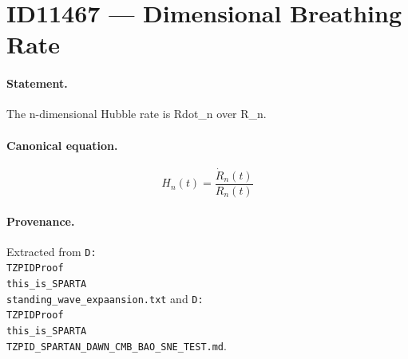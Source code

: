 \section*{ID11467 --- Dimensional Breathing Rate}

\paragraph{Statement.}
The n-dimensional Hubble rate is Rdot_n over R_n.

\paragraph{Canonical equation.}
\[
H_n(t)=\frac{\dot R_n(t)}{R_n(t)}
\]

\paragraph{Provenance.}
Extracted from \texttt{D:\\TZPIDProof\\this\_is\_SPARTA\\standing\_wave\_expaansion.txt} and \texttt{D:\\TZPIDProof\\this\_is\_SPARTA\\TZPID\_SPARTAN\_DAWN\_CMB\_BAO\_SNE\_TEST.md}.
